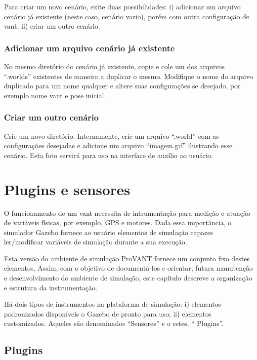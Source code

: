 Para criar um novo cenário, exite duas possibilidades: i) adicionar um arquivo cenário já existente (neste caso, cenário vazio), porém com outra configuração de vant; ii) criar um outro cenário.

\subsection{Adicionar um arquivo cenário já existente}

No mesmo diretório do cenário já existente, copie e cole um dos arquivos ``.worlds'' existentes de maneira a duplicar o mesmo. Modifique o nome do arquivo duplicado para um nome qualquer e altere suas configurações se desejado, por exemplo nome vant e pose inicial.

\subsection{Criar um outro cenário}

Crie um novo diretório. Internamente, crie um arquivo ``.world'' com as configurações desejadas e adicione um arquivo ``imagem.gif'' ilustrando esse cenário. Esta foto servirá para uso na interface de auxílio ao usuário.




\chapter{Plugins e sensores}

O funcionamento de um vant necessita de intrumentação para medição e atuação de variáveis físicas, por exemplo, GPS e motores. Dada essa importância, o simulador Gazebo fornece ao usuário elementos de simulação capazes ler/modificar variáveis de simulação durante a sua execução. 

Esta versão do ambiente de simulação ProVANT fornece um conjunto fixo destes elementos. Assim, com o objetivo de documentá-los e orientar, futura manutenção e desenvolvimento do ambiente de simulação, este capítulo descreve a organização e estrutura da instrumentação.

Há dois tipos de instrumentos na plataforma de simulação: i) elementos padronizados disponíveis o Gazebo de pronto para uso; ii) elementos customizados. Aqueles são denominados ``Sensores'' e o estes, `` Plugins''. 


\section{Plugins}

